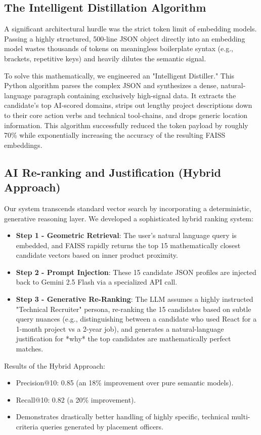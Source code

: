 \documentclass[12pt,a4paper]{report}
\begin{document}
\subsection{The Intelligent Distillation Algorithm}
A significant architectural hurdle was the strict token limit of embedding models. Passing a highly structured, 500-line JSON object directly into an embedding model wastes thousands of tokens on meaningless boilerplate syntax (e.g., brackets, repetitive keys) and heavily dilutes the semantic signal.

To solve this mathematically, we engineered an "Intelligent Distiller." This Python algorithm parses the complex JSON and synthesizes a dense, natural-language paragraph containing exclusively high-signal data. It extracts the candidate's top AI-scored domains, strips out lengthy project descriptions down to their core action verbs and technical tool-chains, and drops generic location information. This algorithm successfully reduced the token payload by roughly 70\% while exponentially increasing the accuracy of the resulting FAISS embeddings.

\subsection{AI Re-ranking and Justification (Hybrid Approach)}
Our system transcends standard vector search by incorporating a deterministic, generative reasoning layer. We developed a sophisticated hybrid ranking system:
\begin{itemize}
    \item \textbf{Step 1 - Geometric Retrieval}: The user's natural language query is embedded, and FAISS rapidly returns the top 15 mathematically closest candidate vectors based on inner product proximity.
    \item \textbf{Step 2 - Prompt Injection}: These 15 candidate JSON profiles are injected back to Gemini 2.5 Flash via a specialized API call.
    \item \textbf{Step 3 - Generative Re-Ranking}: The LLM assumes a highly instructed "Technical Recruiter" persona, re-ranking the 15 candidates based on subtle query nuances (e.g., distinguishing between a candidate who used React for a 1-month project vs a 2-year job), and generates a natural-language justification for *why* the top candidates are mathematically perfect matches.
\end{itemize}

Results of the Hybrid Approach:
\begin{itemize}
    \item Precision@10: 0.85 (an 18\% improvement over pure semantic models).
    \item Recall@10: 0.82 (a 20\% improvement).
    \item Demonstrates drastically better handling of highly specific, technical multi-criteria queries generated by placement officers.
\end{itemize}
\end{document}
